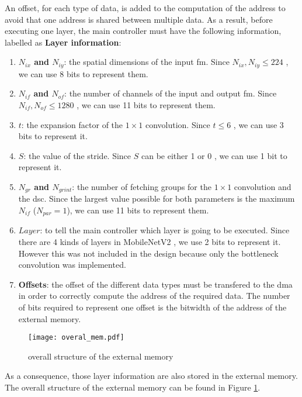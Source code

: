 An offset, for each type of data, is added to the computation of the address to avoid that one address is shared between multiple data. As a result, before executing one layer, the main controller must have the following information, labelled as \textbf{Layer information}:
%
\begin{enumerate}
    \item \textbf{$N_{ix}$ and $N_{iy}$}: the spatial dimensions of the input \acrshort{fm}. Since $N_{ix}, N_{iy} \leq 224$ \cite{sandler_mobilenetv2_2019}, we can use 8 bits to represent them.
    \item \textbf{$N_{if}$ and $N_{of}$}: the number of channels of the input  and output \acrshort{fm}. Since $N_{if}, N_{of} \leq 1280$ \cite{sandler_mobilenetv2_2019}, we can use 11 bits to represent them.
    \item \textbf{$t$}: the expansion factor of the $1 \times 1$ convolution. Since $t \leq 6$ \cite{sandler_mobilenetv2_2019}, we can use 3 bits to represent it.
    \item \textbf{$S$}: the value of the stride. Since $S$ can be either 1 or 0 \cite{sandler_mobilenetv2_2019}, we can use 1 bit to represent it.
    \item \textbf{$N_{gr}$ and $N_{grint}$}: the number of fetching groups for the $1 \times 1$ convolution and the \acrshort{dsc}. Since the largest value possible for both parameters is the maximum $N_{if}$ ($N_{par} = 1$), we can use 11 bits to represent them.
    \item \textbf{$Layer$}: to tell the main controller which layer is going to be executed. Since there are 4 kinds of layers in MobileNetV2 \cite{sandler_mobilenetv2_2019}, we use 2 bits to represent it. However this was not included in the design because only the bottleneck convolution was implemented.
    \item \textbf{Offsets}: the offset of the different data types must be transfered to the \acrshort{dma} in order to correctly compute the address of the required data. The number of bits required to represent one offset is the bitwidth of the address of the external memory.
\end{enumerate}

%
\begin{figure}
    \centering
    \texttt{[image: overal\_mem.pdf]}
    \caption{overall structure of the external memory}
    \label{fig:overal_mem}
\end{figure}
%
As a consequence, those layer information are also stored in the external memory. The overall structure of the external memory can be found in Figure \ref{fig:overal_mem}.

